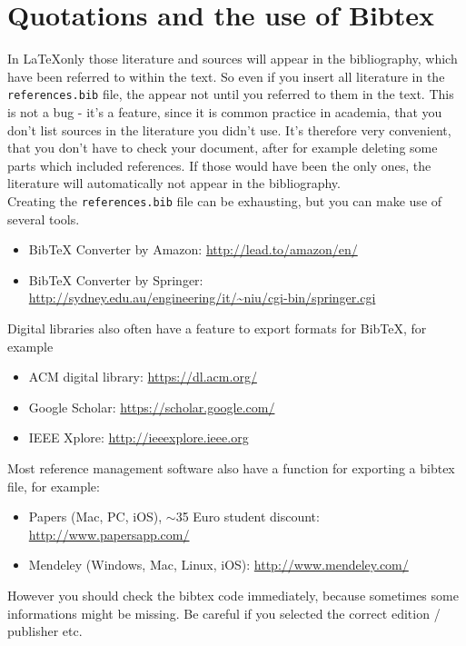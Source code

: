 
\chapter{Quotations and the use of Bibtex} %
\label{cha:quotations_and_the_use_of_bibtex}

In \LaTeX only those literature and sources will appear in the bibliography, which have been referred to within the text. So even if you insert all literature in the \texttt{references.bib} file, the appear not until you referred to them in the text. This is not a bug - it's a feature, since it is common practice in academia, that you don't list sources in the literature you didn't use. It's therefore very convenient, that you don't have to check your document, after for example deleting some parts which included references. If those would have been the only ones, the literature will automatically not appear in the bibliography. \\

Creating the \texttt{references.bib} file can be exhausting, but you can make use of several tools. 

\begin{itemize}
	\item BibTeX Converter by Amazon: \url{http://lead.to/amazon/en/}
	\item BibTeX Converter by Springer: \url{http://sydney.edu.au/engineering/it/~niu/cgi-bin/springer.cgi}
\end{itemize}

Digital libraries also often have a feature to export formats for BibTeX, for example

\begin{itemize}
	\item ACM digital library: \url{https://dl.acm.org/}
	\item Google Scholar: \url{https://scholar.google.com/}
	\item IEEE Xplore: \url{http://ieeexplore.ieee.org}
\end{itemize}

Most reference management software also have a function for exporting a bibtex file, for example:

\begin{itemize}
	\item Papers (Mac, PC, iOS), $\sim$35 Euro student discount: \url{http://www.papersapp.com/}
	\item Mendeley (Windows, Mac, Linux, iOS): \url{http://www.mendeley.com/}
\end{itemize}

However you should check the bibtex code immediately, because sometimes some informations might be missing. Be careful if you selected the correct edition / publisher etc.




